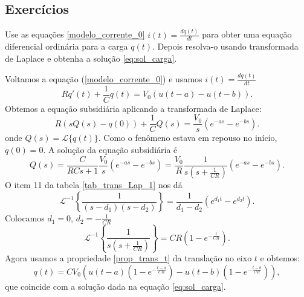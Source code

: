 \subsection*{Exercícios}
\begin{exer}
Use as equações \eqref{modelo_corrente_0} $i(t)=\frac{dq(t)}{dt}$ para obter uma equação diferencial ordinária para a carga $q(t)$. Depois resolva-o usando transformada de Laplace e obtenha a solução \eqref{eq:sol_carga}.
\end{exer}
\begin{resp}
Voltamos a equação (\ref{modelo_corrente_0}) e usamos $i(t)=\frac{dq(t)}{dt}$
\begin{equation}
 Rq'(t)+\frac{1}{C}q(t)=V_0\left(u(t-a)-u(t-b)\right).
\end{equation}
Obtemos a equação subsidiária aplicando a transformada de Laplace:
\begin{equation*}
  R\left(sQ(s)-q(0)\right)+\frac{1}{C}Q(s)=\frac{V_0}{s}\left(e^{-as}-e^{-bs}\right).
\end{equation*}
onde $Q(s)=\mathcal{L}\{q(t)\}$. Como o fenômeno estava em repouso no início, $q(0)=0$. A solução da equação subsidiária é
\begin{equation}
Q(s)=\frac{C}{RCs+1}\frac{V_0}{s}\left(e^{-as}-e^{-bs}\right)=\frac{V_0}{R}\frac{1}{s\left(s+\frac{1}{CR}\right)}\left(e^{-as}-e^{-bs}\right).
\end{equation}
O item 11 da tabela \ref{tab_trans_Lap_1} nos dá 
\begin{equation}
\mathcal{L}^{-1}\left\{\frac{1}{(s-d_1)(s-d_2)}\right\}=\frac{1}{d_1-d_2}\left(e^{d_1t}-e^{d_2t}\right).
\end{equation}
Colocamos $d_1=0$, $d_2=-\frac{1}{CR}$ 
\begin{equation}
\mathcal{L}^{-1}\left\{\frac{1}{s\left(s+\frac{1}{CR}\right)}\right\}=CR\left(1-e^{-\frac{t}{CR}}\right).
\end{equation}
Agora usamos a propriedade \ref{prop_trans_t} da translação no eixo $t$ e obtemos:
\begin{equation}
q(t)=CV_0\left(u(t-a)\left(1-e^{-\frac{t-a}{CR}}\right)-u(t-b)\left(1-e^{-\frac{t-b}{CR}}\right) \right),
\end{equation}
que coincide com a solução dada na equação \eqref{eq:sol_carga}.
\end{resp}









